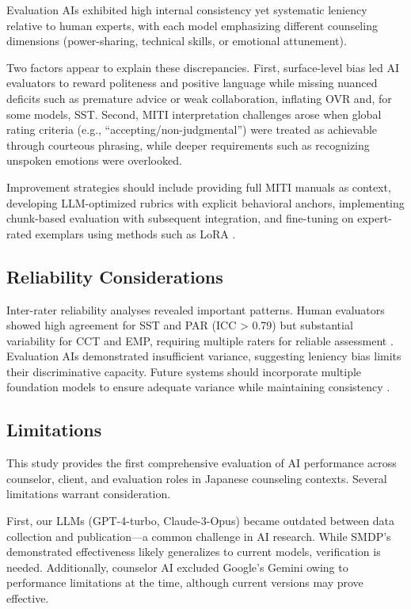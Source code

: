 \documentclass{wiley-article}
\begin{document}
Evaluation AIs exhibited high internal consistency yet systematic leniency relative to human experts, with each model emphasizing different counseling dimensions (power-sharing, technical skills, or emotional attunement).

Two factors appear to explain these discrepancies. First, surface-level bias led AI evaluators to reward politeness and positive language while missing nuanced deficits such as premature advice or weak collaboration, inflating OVR and, for some models, SST. Second, MITI interpretation challenges arose when global rating criteria (e.g., “accepting/non-judgmental”) were treated as achievable through courteous phrasing, while deeper requirements such as recognizing unspoken emotions were overlooked.

Improvement strategies should include providing full MITI manuals as context, developing LLM-optimized rubrics with explicit behavioral anchors, implementing chunk-based evaluation with subsequent integration, and fine-tuning on expert-rated exemplars using methods such as LoRA \citep{zhangPLaDPreferencebasedLarge2024}.

\subsection*{Reliability Considerations}

Inter-rater reliability analyses revealed important patterns. Human evaluators showed high agreement for SST and PAR (ICC > 0.79) but substantial variability for CCT and EMP, requiring multiple raters for reliable assessment \citep{kooGuidelineSelectingReporting2016}. Evaluation AIs demonstrated insufficient variance, suggesting leniency bias limits their discriminative capacity. Future systems should incorporate multiple foundation models to ensure adequate variance while maintaining consistency \citep{morganLLMJuriesEvaluation2025}.

\subsection*{Limitations}

This study provides the first comprehensive evaluation of AI performance across counselor, client, and evaluation roles in Japanese counseling contexts. Several limitations warrant consideration.

First, our LLMs (GPT-4-turbo, Claude-3-Opus) became outdated between data collection and publication—a common challenge in AI research. While SMDP’s demonstrated effectiveness likely generalizes to current models, verification is needed. Additionally, counselor AI excluded Google’s Gemini owing to performance limitations at the time, although current versions may prove effective.
\end{document}
